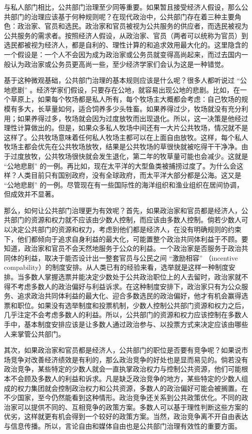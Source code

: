 
与私人部门相比，公共部门治理至少同等重要。如果暂且接受经济人假设，那么公共部门的治理应该基于何种规则呢？在现代政治中，公共部门存在着三种主要角色：政治家、官员和选民。政治家和官员被视为公共服务的供应者，而选民被视为公共服务的需求者。按照经济人假设，从政治家、官员（两者可以统称为官员）到选民都被视为经济人，都是自利的、理性计算的和追求效用最大化的。这里隐含的一个假设是：一个人不会因为成为政治家或公务员就变得高尚起来，而过去国内一般认为政治家或公务员更高尚一些，至少经济学家们会认为这是一种错觉。

基于这种微观基础，公共部门治理的基本规则应该是什么呢？很多人都听说过 “公地悲剧” 。经济学家们假设，只要存在公地，就容易出现公地的悲剧。比如，在一个草原上，如果每个牧场都是私人所有，每个牧场主大概都会考虑：自己牧场的规模有多大，长草量如何，适合饲养多少头牲畜。如果养得过少，牧场就没有充分利用；如果养得过多，牧场就会因为过度放牧而出现退化。所以，这一决策是他经过理性计算做出的。但是，如果众多私人牧场中间还有一大片公共牧场，情况就不是这样了。公共牧场意味着任何私人牧场主都可以在上面自由放牧。这样，每个私人牧场主都会优先在公共牧场放牧，结果是公共牧场的草很快就被吃得干干净净。由于过度放牧，公共牧场很快就会发生退化，第二年的牧草量可能也会减少。这就是 “公地悲剧” 的一例。再比如，现在太平洋的大型鱼类被捕捞过度了。为什么会这样？人类目前只有国别政府，没有全球政府，而太平洋大部分都是公海。这又是 “公地悲剧” 的一例。尽管现在有一些国际性的海洋组织和渔业组织在居间协调，但成效并不显著。

那么，如何让公共部门治理更为有效呢？首先，如果政治家和官员都是经济人，公共部门的资源和权力就不应该由少数人控制，而应该由多数人控制。倘若少数人可以决定公共部门的资源和权力，考虑到他们都是经济人，在没有明确规则的约束下，他们都倾向于追求自身利益的最大化，可能置整个政治共同体利益于不顾。要知道，政治家和官员不会天然地服务于公众的利益。一个政治家是否服务于政治共同体的利益，取决于能否设计出一整套官员与公民之间 “激励相容” （incentive compability）的制度安排。从人类已有的经验来看，选举就是这样一种制度安排。当多数人掌握选票并能决定少数处于公共政治职位上的人去留时，政治家就不得不考虑多数人的政治偏好与利益诉求。在这种制度安排下，政治家只有为公众服务、追求政治共同体利益的最大化、迎合多数选民的政治偏好，他才有机会赢得选票和职位。如果没有选举制度和投票机制，少数人控制公共部门资源和权力之后，几乎注定不会考虑多数人的利益。所以，公共部门的资源和权力应该控制在多数人手中，基本制度安排应该是让多数人通过政治参与、以投票方式来决定应该由哪些人来掌管公共部门。

其次，如果政治家和官员都是经济人，公共部门的职位是否要有竞争呢？如果说市场竞争对改善经济绩效是有利的，那么政治竞争的好处也是显而易见的。倘若没有政治竞争，某些特定的少数人就会一直执掌政治权力与控制公共资源，他们可能根本不会顾及多数人的利益和诉求。凡是缺乏政治竞争的地方，某些特定的少数人组成的权力集团就会控制政治权力和公共资源，多数人的政治偏好可能会被搁置。在不少国家，至今仍然能看到这种情形。政治竞争还关系到公共政策优化。不同的政治家可以提供不同的、互相竞争的政策方案。多数人可以基于理性判断这些方案的优劣，这样就更有机会得到一个较好的政策方案。当然，政治竞争离不开自由表达与信息传播。所以，言论自由和媒体自由也是公共部门治理有效性的重要方面。

